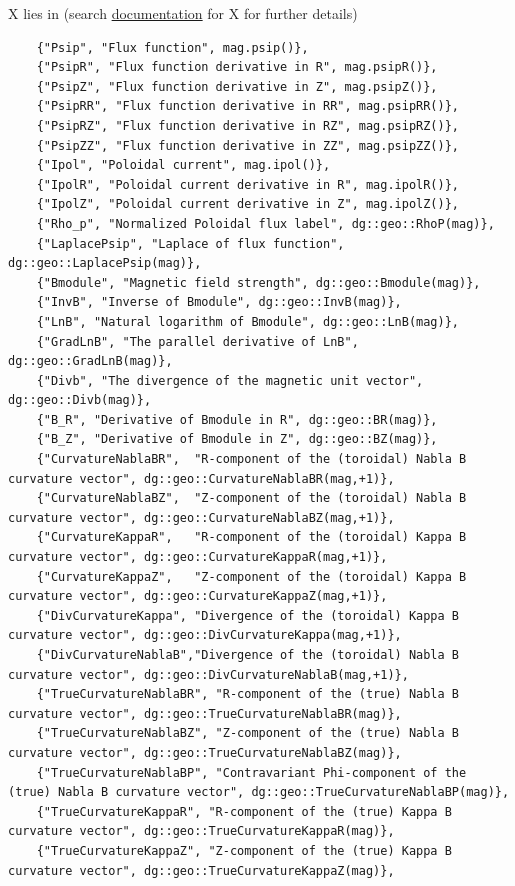 X lies in (search
\href{https://feltor-dev.github.io/feltor/geometries/html/topics.html}{documentation} for X for further details)
\begin{verbatim}
    {"Psip", "Flux function", mag.psip()},
    {"PsipR", "Flux function derivative in R", mag.psipR()},
    {"PsipZ", "Flux function derivative in Z", mag.psipZ()},
    {"PsipRR", "Flux function derivative in RR", mag.psipRR()},
    {"PsipRZ", "Flux function derivative in RZ", mag.psipRZ()},
    {"PsipZZ", "Flux function derivative in ZZ", mag.psipZZ()},
    {"Ipol", "Poloidal current", mag.ipol()},
    {"IpolR", "Poloidal current derivative in R", mag.ipolR()},
    {"IpolZ", "Poloidal current derivative in Z", mag.ipolZ()},
    {"Rho_p", "Normalized Poloidal flux label", dg::geo::RhoP(mag)},
    {"LaplacePsip", "Laplace of flux function", dg::geo::LaplacePsip(mag)},
    {"Bmodule", "Magnetic field strength", dg::geo::Bmodule(mag)},
    {"InvB", "Inverse of Bmodule", dg::geo::InvB(mag)},
    {"LnB", "Natural logarithm of Bmodule", dg::geo::LnB(mag)},
    {"GradLnB", "The parallel derivative of LnB", dg::geo::GradLnB(mag)},
    {"Divb", "The divergence of the magnetic unit vector", dg::geo::Divb(mag)},
    {"B_R", "Derivative of Bmodule in R", dg::geo::BR(mag)},
    {"B_Z", "Derivative of Bmodule in Z", dg::geo::BZ(mag)},
    {"CurvatureNablaBR",  "R-component of the (toroidal) Nabla B curvature vector", dg::geo::CurvatureNablaBR(mag,+1)},
    {"CurvatureNablaBZ",  "Z-component of the (toroidal) Nabla B curvature vector", dg::geo::CurvatureNablaBZ(mag,+1)},
    {"CurvatureKappaR",   "R-component of the (toroidal) Kappa B curvature vector", dg::geo::CurvatureKappaR(mag,+1)},
    {"CurvatureKappaZ",   "Z-component of the (toroidal) Kappa B curvature vector", dg::geo::CurvatureKappaZ(mag,+1)},
    {"DivCurvatureKappa", "Divergence of the (toroidal) Kappa B curvature vector", dg::geo::DivCurvatureKappa(mag,+1)},
    {"DivCurvatureNablaB","Divergence of the (toroidal) Nabla B curvature vector", dg::geo::DivCurvatureNablaB(mag,+1)},
    {"TrueCurvatureNablaBR", "R-component of the (true) Nabla B curvature vector", dg::geo::TrueCurvatureNablaBR(mag)},
    {"TrueCurvatureNablaBZ", "Z-component of the (true) Nabla B curvature vector", dg::geo::TrueCurvatureNablaBZ(mag)},
    {"TrueCurvatureNablaBP", "Contravariant Phi-component of the (true) Nabla B curvature vector", dg::geo::TrueCurvatureNablaBP(mag)},
    {"TrueCurvatureKappaR", "R-component of the (true) Kappa B curvature vector", dg::geo::TrueCurvatureKappaR(mag)},
    {"TrueCurvatureKappaZ", "Z-component of the (true) Kappa B curvature vector", dg::geo::TrueCurvatureKappaZ(mag)},

\end{verbatim}
